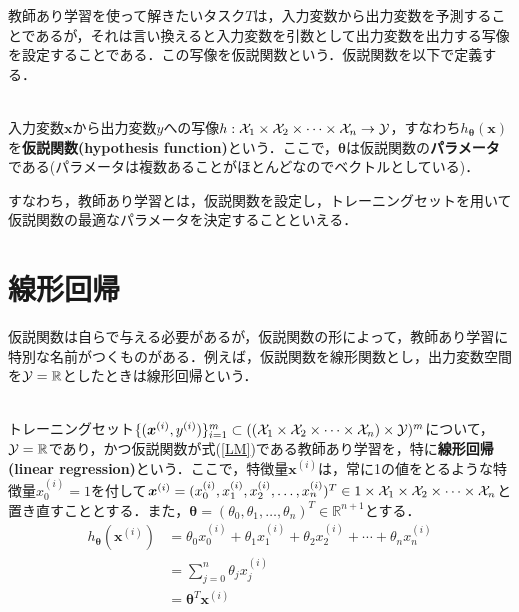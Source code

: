 教師あり学習を使って解きたいタスク$T$は，入力変数から出力変数を予測することであるが，それは言い換えると入力変数を引数として出力変数を出力する写像を設定することである．この写像を仮説関数という．仮説関数を以下で定義する．

\begin{defi}[仮説関数]
　\\
入力変数${\bm x}$から出力変数$y$への写像$h:{\cal X}_1 \times {\cal X}_2\times \cdots \times{\cal X}_n \to {\cal Y}$，すなわち$h_{\bm \theta}({\bm x})$を{\bf 仮説関数(hypothesis function)}という．ここで，${\bm \theta}$は仮説関数の{\bf パラメータ}である(パラメータは複数あることがほとんどなのでベクトルとしている)．
\end{defi}

すなわち，教師あり学習とは，仮説関数を設定し，トレーニングセットを用いて仮説関数の最適なパラメータを決定することといえる．

\section{線形回帰}

仮説関数は自らで与える必要があるが，仮説関数の形によって，教師あり学習に特別な名前がつくものがある．例えば，仮説関数を線形関数とし，出力変数空間を${\cal Y}=\mathbb{R}$としたときは線形回帰という．

\begin{defi}[線形回帰]
　\\
トレーニングセット$\{({\bm x}^{(i)},y^{(i)})\}_{i=1}^m \subset (({\cal X}_1 \times {\cal X}_2\times \cdots \times{\cal X}_n) \times {\cal Y})^m$について，${\cal Y}=\mathbb{R}$であり，かつ仮説関数が式(\ref{LM})である教師あり学習を，特に{\bf 線形回帰(linear regression)}という．ここで，特徴量${\bm x}^{(i)}$は，常に1の値をとるような特徴量$x_0^{(i)}=1$を付して${\bm x}^{(i)}=(x_0^{(i)},x_1^{(i)},x_2^{(i)},\ldots,x_n^{(i)})^T \in 1 \times {\cal X}_1 \times {\cal X}_2\times \cdots \times{\cal X}_n$と置き直すこととする．また，${\bm \theta}=(\theta_0,\theta_1,\ldots,\theta_n)^T \in \mathbb{R}^{n+1}$とする．
\begin{align}
h_{{\bm \theta}}({\bm x}^{(i)}) &= \theta_0 x_0^{(i)}+\theta_1 x_1^{(i)} +\theta_2 x_2^{(i)}+\cdots + \theta_n x_n^{(i)} \nonumber \\
&= \sum_{j=0}^n \theta_j x_j^{(i)}\nonumber \\
&= {\bm \theta}^T {\bm x}^{(i)} \label{LM}
\end{align}
\end{defi}

